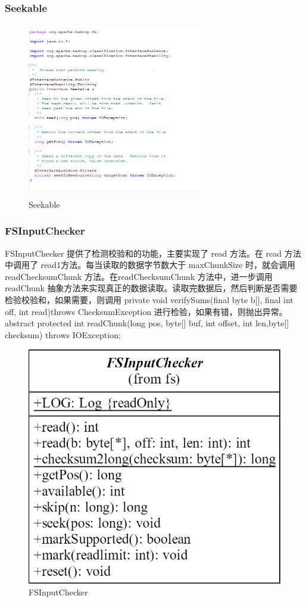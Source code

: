 	
	 \subsubsection{Seekable}

	\begin{figure}
		\centering
		\includegraphics[width=3in,height=3in]{UML/inputstream/Seekable.png}
		\caption{Seekable}
		\label{fig:graph6}
	\end{figure}
	
	\subsubsection{FSInputChecker}
	FSInputChecker 提供了检测校验和的功能，主要实现了 read 方法。在 read 方法中调用了 read1方法。每当读取的数据字节数大于 maxChunkSize 时，就会调用 readChecksumChunk 方法。在readChecksumChunk 方法中，进一步调用 readChunk 抽象方法来实现真正的数据读取。读取完数据后，然后判断是否需要检验校验和，如果需要，则调用 private void verifySums(final byte b[], final int off, int read)throws ChecksumException 进行检验，如果有错，则抛出异常。abstract protected int readChunk(long pos, byte[] buf, int offset, int len,byte[] checksum) throws IOException;
	
	\begin{figure}
		\centering
		\includegraphics[width=0.7\linewidth]{UML/inputstream/FSInputChecker.png}
		\caption{FSInputChecker}
		\label{fig:graph7}
	\end{figure}
